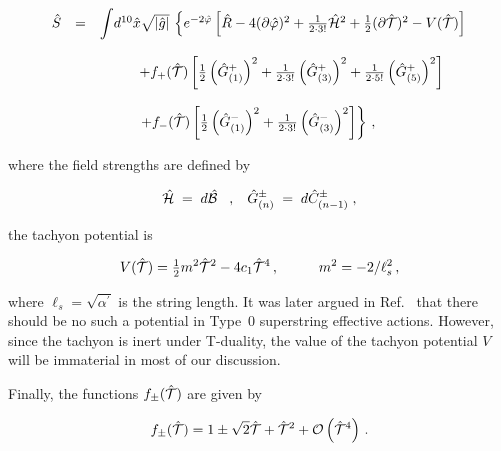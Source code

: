 \documentclass[12pt,a4paper]{article}
\begin{document}
\begin{equation}
\label{eq:0Baction-1}
\begin{array}{rcl}
\hat{S} & = & {\displaystyle\int} d^{10}\hat{x}\sqrt{|\hat{g}|}\,
\left\{e^{-2\hat{\varphi}} \left[ \hat{R} -4(\partial\hat{\varphi})^{2}
+\frac{1}{2\cdot 3!}\hat{\cal H}^{2}+\frac{1}{2}(\partial\hat{\cal T})^{2}
-V(\hat{\cal T})\right] \right.\\
& & \\
& & 
\hspace{1cm}
+f_{+}(\hat{\cal T})
\left[\frac{1}{2}\left(\hat{G}_{(1)}^{+}\right)^{2} 
+\frac{1}{2\cdot 3!}\left(\hat{G}_{(3)}^{+}\right)^{2}
+\frac{1}{2\cdot 5!}\left(\hat{G}_{(5)}^{+}\right)^{2}
\right]\\
& & \\
& & 
\hspace{1cm}
\left.
+f_{-}(\hat{\cal T})
\left[\frac{1}{2}\left(\hat{G}_{(1)}^{-}\right)^{2} 
+\frac{1}{2\cdot 3!}\left(\hat{G}_{(3)}^{-}\right)^{2}
\right]\right\}\, ,\\
\end{array}
\end{equation}

\noindent where the field strengths are defined by

\begin{equation}
  \label{eq:10dfieldstrengths}
  \hat{\mathcal{H}}\;=\; d\hat{\mathcal{B}}\hspace{.3cm},\hspace{.3cm}
  \hat{G}_{(n)}^{\pm}\;=\; d\hat{C}_{(n-1)}^{\pm} \; ,
\end{equation}

\noindent the tachyon potential is

\begin{equation}
V(\hat{\cal T})
={\textstyle\frac{1}{2}}m^{2}\hat{\cal T}^{2}-4c_{1}\hat{\cal T}^{4}\, ,
\hspace{1cm}
m^{2} =-2/\ell_{s}^{2}\, ,
\end{equation}

\noindent where $\ell_{s}=\sqrt{\alpha^{\prime}}$ 
is the string length.  It was later argued in Ref.~\cite{kn:Ts2} that
there should be no such a potential in Type~0 superstring effective
actions. However, since the tachyon is inert under T-duality, the
value of the tachyon potential $V$ will be immaterial in most of our
discussion.

Finally, the functions $f_{\pm}(\hat{\cal T})$ are given by

\begin{equation}
f_{\pm}(\hat{\cal T})=1\pm\sqrt{2}\hat{\cal T}+\hat{\cal T}^{2}+
\mathcal{O}\left(\hat{\mathcal{T}}^{4}\right) \, .
\end{equation}
\end{document}
